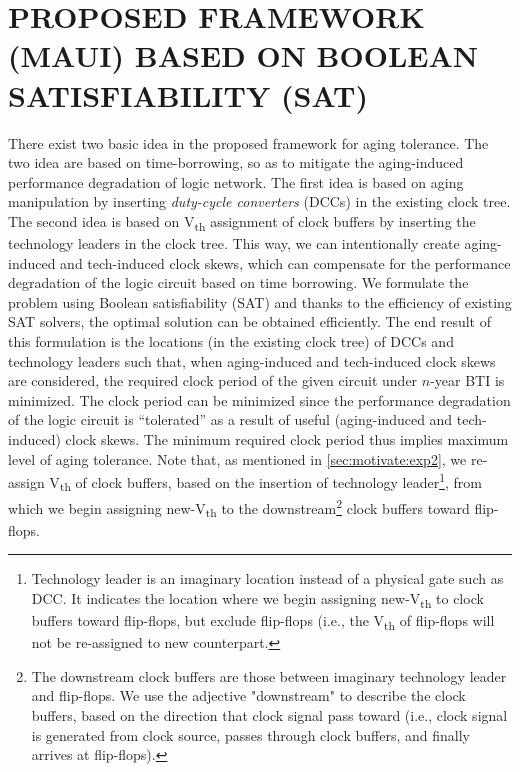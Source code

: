 \section{PROPOSED FRAMEWORK (MAUI) BASED ON BOOLEAN SATISFIABILITY (SAT)}
\label{sec:framework}
There exist two basic idea in the proposed framework for aging tolerance. The two idea are based on time-borrowing, so as to mitigate the aging-induced performance degradation of logic network. The first idea is based on aging manipulation by inserting \textit{duty-cycle converters} (DCCs) in the existing clock tree. The second idea is based on V\textsubscript{th} assignment of clock buffers by inserting the technology leaders in the clock tree. This way, we can intentionally create aging-induced and tech-induced clock skews, which can compensate for the performance degradation of the logic circuit based on time borrowing. We formulate the problem using Boolean satisfiability (SAT) and thanks to the efficiency of existing SAT solvers, the optimal solution can be obtained efficiently. The end result of this formulation is the locations (in the existing clock tree) of DCCs and technology leaders such that, when aging-induced and tech-induced clock skews are considered, the required clock period of the given circuit under $n$-year BTI is minimized. The clock period can be minimized since the performance degradation of the logic circuit is \enquote{tolerated} as a result of useful (aging-induced and tech-induced) clock skews. The minimum required clock period thus implies maximum level of aging tolerance. Note that, as mentioned in \ref{sec:motivate:exp2}, we re-assign V\textsubscript{th} of clock buffers, based on the insertion of technology leader\footnote{Technology leader is an imaginary location instead of a physical gate such as DCC. It indicates the location where we begin assigning new-V\textsubscript{th} to clock buffers toward flip-flops, but exclude flip-flops (i.e., the V\textsubscript{th} of flip-flops will not be re-assigned to new counterpart.}, from which we begin assigning new-V\textsubscript{th} to the downstream\footnote{The downstream clock buffers are those between imaginary technology leader and flip-flops. We use the adjective "downstream" to describe the clock buffers, based on the direction that clock signal pass toward (i.e., clock signal is generated from clock source, passes through clock buffers, and finally arrives at flip-flops).} clock buffers toward flip-flops.
